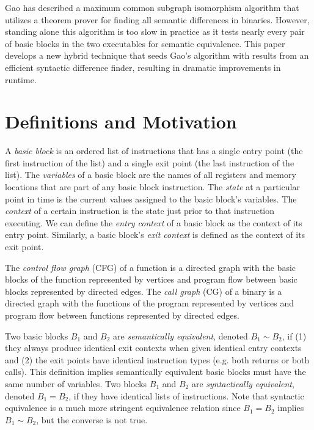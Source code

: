\documentclass[11pt,twocolumn]{article}
\begin{document}
Gao \cite{sdibe} has described a maximum common subgraph isomorphism algorithm that utilizes a theorem prover for finding all semantic differences in binaries.  However, standing alone this algorithm is too slow in practice as it tests nearly every pair of basic blocks in the two executables for semantic equivalence.
This paper develops a new hybrid technique that seeds Gao's algorithm with results from an efficient syntactic difference finder, resulting in dramatic improvements in runtime.

\section{Definitions and Motivation}


A \emph{basic block} is an ordered list of instructions that has a single entry point (the first instruction of the list) and a single exit point (the last instruction of the list).  
The \emph{variables} of a basic block are the names of all registers and memory locations that are part of any basic block instruction.
The \emph{state} at a particular point in time is the current values assigned to the basic block's variables.
The \emph{context} of a certain instruction is the state just prior to that instruction executing.  We can define the \emph{entry context} of a basic block as the context of its entry point.  Similarly, a basic block's \emph{exit context}  is defined as the context of its exit point.

The \emph{control flow graph} (CFG) of a function is a directed graph with the basic blocks of the function represented by vertices and program flow between basic blocks represented by directed edges.  The \emph{call graph} (CG) of a binary is a directed graph with the functions of the program represented by vertices and program flow between functions represented by directed edges.

Two basic blocks $B_1$ and $B_2$ are \emph{semantically equivalent}, denoted $B_1 \sim B_2$, if (1) they always produce identical exit contexts when given identical entry contexts and (2) the exit points have identical instruction types (e.g. both returns or both calls).  This definition implies semantically equivalent basic blocks must have the same number of variables.  Two blocks $B_1$ and $B_2$ are \emph{syntactically equivalent}, denoted $B_1 = B_2$, if they have identical lists of instructions.
Note that syntactic equivalence is a much more stringent equivalence relation since $B_1 = B_2$ implies $B_1 \sim B_2$, but the converse is not true.
\end{document}
